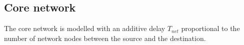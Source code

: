\subsection{Core network}
The core network is modelled with an additive delay $T_{net}$ proportional to the number of network nodes between the source and the destination.